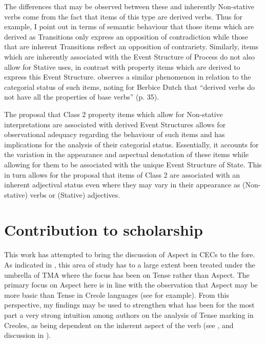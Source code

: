 The differences that may be observed between these and inherently Non-stat\-ive verbs come from the fact that items of this type are derived verbs. Thus for example, I point out in terms of semantic behaviour that those items which are derived as Transitions only express an opposition of contradiction while those that are inherent Transitions reflect an opposition of contrariety. Similarly, items which are inherently associated with the Event Structure of Process do not also allow for Stative uses, in contrast with property items which are derived to express this Event Structure. \citet{Kouwenberg1996} observes a similar phenomenon in relation to the categorial status of such items, noting for Berbice Dutch that “derived verbs do not have all the properties of base verbs” (p. 35).

The proposal that Class 2 property items which allow for Non-stative interpretations are associated with derived Event Structures allows for observational adequacy regarding the behaviour of such items and has implications for the analysis of their categorial status. Essentially, it accounts for the variation in the appearance and aspectual denotation of these items while allowing for them to be associated with the unique Event Structure of State. This in turn allows for the proposal that items of Class 2 are associated with an inherent adjectival status even where they may vary in their appearance as (Non-stative) verbs or (Stative) adjectives. 


\section{Contribution to scholarship}\label{sec:6.2}

This work has attempted to bring the discussion of Aspect in CECs to the fore. As indicated in , this area of study has to a large extent been treated under the umbrella of TMA where the focus has been on Tense rather than Aspect. The primary focus on Aspect here is in line with the observation that Aspect may be more basic than Tense in Creole languages (see \citealt{Alleyne1980} for example). From this perspective, my findings may be used to strengthen what has been for the most part a very strong intuition among authors on the analysis of Tense marking in Creoles, as being dependent on the inherent aspect of the verb (see \citealt{Winford1993}, and discussion in ). 

